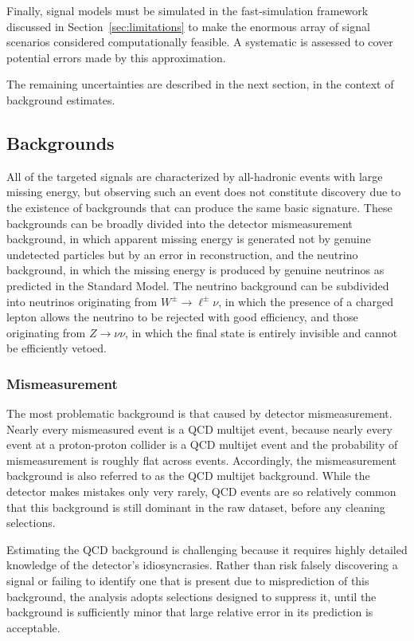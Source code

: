   Finally, signal models must be simulated in the fast-simulation framework discussed in Section~\ref{sec:limitations} to make the enormous array of signal scenarios considered computationally feasible.
  A systematic is assessed to cover potential errors made by this approximation.

  The remaining uncertainties are described in the next section, in the context of background estimates.

  \subsection{Backgrounds} \label{sec:MT2bg}

  All of the targeted signals are characterized by all-hadronic events with large missing energy, but observing such an event does not constitute discovery due to the existence of backgrounds that can produce the same basic signature.
  These backgrounds can be broadly divided into the detector mismeasurement background, in which apparent missing energy is generated not by genuine undetected particles but by an error in reconstruction, and the neutrino background, in which the missing energy is produced by genuine neutrinos as predicted in the Standard Model.
  The neutrino background can be subdivided into neutrinos originating from $W^{\pm}\rightarrow \ell^{\pm}\nu$, in which the presence of a charged lepton allows the neutrino to be rejected with good efficiency, and those originating from $Z\rightarrow \nu\nu$, in which the final state is entirely invisible and cannot be efficiently vetoed.

  
    \subsubsection{Mismeasurement} \label{sec:MT2QCD}
  
    The most problematic background is that caused by detector mismeasurement.
    Nearly every mismeasured event is a QCD multijet event, because nearly every event at a proton-proton collider is a QCD multijet event and the probability of mismeasurement is roughly flat across events. 
    Accordingly, the mismeasurement background is also referred to as the QCD multijet background.
    While the detector makes mistakes only very rarely, QCD events are so relatively common that this background is still dominant in the raw dataset, before any cleaning selections.

    Estimating the QCD background is challenging because it requires highly detailed knowledge of the detector's idiosyncrasies.
    Rather than risk falsely discovering a signal or failing to identify one that is present due to misprediction of this background, the analysis adopts selections designed to suppress it, until the background is sufficiently minor that large relative error in its prediction is acceptable.
    
